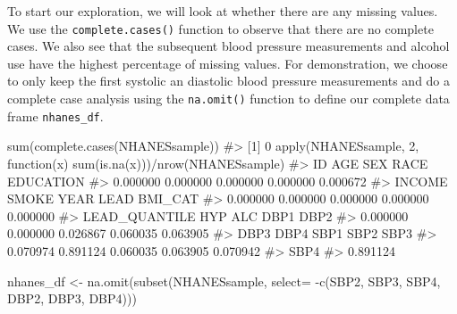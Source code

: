 \documentclass[
  letterpaper,
]{krantz}
\makeatletter
\newenvironment{Shaded}{\begin{snugshade}}{\end{snugshade}}
\newcommand{\AttributeTok}[1]{\textcolor[rgb]{0.40,0.45,0.13}{#1}}
\newcommand{\CommentTok}[1]{\textcolor[rgb]{0.37,0.37,0.37}{#1}}
\newcommand{\ControlFlowTok}[1]{\textcolor[rgb]{0.00,0.23,0.31}{#1}}
\newcommand{\DecValTok}[1]{\textcolor[rgb]{0.68,0.00,0.00}{#1}}
\newcommand{\FunctionTok}[1]{\textcolor[rgb]{0.28,0.35,0.67}{#1}}
\newcommand{\NormalTok}[1]{\textcolor[rgb]{0.00,0.23,0.31}{#1}}
\newcommand{\OtherTok}[1]{\textcolor[rgb]{0.00,0.23,0.31}{#1}}
\newcommand{\SpecialCharTok}[1]{\textcolor[rgb]{0.37,0.37,0.37}{#1}}
\newenvironment{kframe}{%
\medskip{}
\setlength{\fboxsep}{.8em}
 \def\at@end@of@kframe{}%
 \ifinner\ifhmode%
  \def\at@end@of@kframe{\end{minipage}}%
  \begin{minipage}{\columnwidth}%
 \fi\fi%
 \def\FrameCommand##1{\hskip\@totalleftmargin \hskip-\fboxsep
 \colorbox{shadecolor}{##1}\hskip-\fboxsep
     \hskip-\linewidth \hskip-\@totalleftmargin \hskip\columnwidth}%
 \MakeFramed {\advance\hsize-\width
   \@totalleftmargin\z@ \linewidth\hsize
   \@setminipage}}%
 {\par\unskip\endMakeFramed%
 \at@end@of@kframe}
\renewenvironment{Shaded}{\begin{kframe}}{\end{kframe}}
\makeatother
\begin{document}
To start our exploration, we will look at whether there are any missing
values. We use the \texttt{complete.cases()} function to observe that
there are no complete cases. We also see that the subsequent blood
pressure measurements and alcohol use have the highest percentage of
missing values. For demonstration, we choose to only keep the first
systolic an diastolic blood pressure measurements and do a complete case
analysis using the \texttt{na.omit()} function to define our complete
data frame \texttt{nhanes\_df}.

\begin{Shaded}
\begin{Highlighting}[]
\FunctionTok{sum}\NormalTok{(}\FunctionTok{complete.cases}\NormalTok{(NHANESsample))}
\CommentTok{\#\textgreater{} [1] 0}
\FunctionTok{apply}\NormalTok{(NHANESsample, }\DecValTok{2}\NormalTok{, }\ControlFlowTok{function}\NormalTok{(x) }\FunctionTok{sum}\NormalTok{(}\FunctionTok{is.na}\NormalTok{(x)))}\SpecialCharTok{/}\FunctionTok{nrow}\NormalTok{(NHANESsample)}
\CommentTok{\#\textgreater{}            ID           AGE           SEX          RACE     EDUCATION }
\CommentTok{\#\textgreater{}      0.000000      0.000000      0.000000      0.000000      0.000672 }
\CommentTok{\#\textgreater{}        INCOME         SMOKE          YEAR          LEAD       BMI\_CAT }
\CommentTok{\#\textgreater{}      0.000000      0.000000      0.000000      0.000000      0.000000 }
\CommentTok{\#\textgreater{} LEAD\_QUANTILE           HYP           ALC          DBP1          DBP2 }
\CommentTok{\#\textgreater{}      0.000000      0.000000      0.026867      0.060035      0.063905 }
\CommentTok{\#\textgreater{}          DBP3          DBP4          SBP1          SBP2          SBP3 }
\CommentTok{\#\textgreater{}      0.070974      0.891124      0.060035      0.063905      0.070942 }
\CommentTok{\#\textgreater{}          SBP4 }
\CommentTok{\#\textgreater{}      0.891124}
\end{Highlighting}
\end{Shaded}

\begin{Shaded}
\begin{Highlighting}[]
\NormalTok{nhanes\_df }\OtherTok{\textless{}{-}} \FunctionTok{na.omit}\NormalTok{(}\FunctionTok{subset}\NormalTok{(NHANESsample, }
                            \AttributeTok{select=} \SpecialCharTok{{-}}\FunctionTok{c}\NormalTok{(SBP2, SBP3, SBP4, DBP2, DBP3, }
\NormalTok{                                       DBP4)))}
\end{Highlighting}
\end{Shaded}
\end{document}
